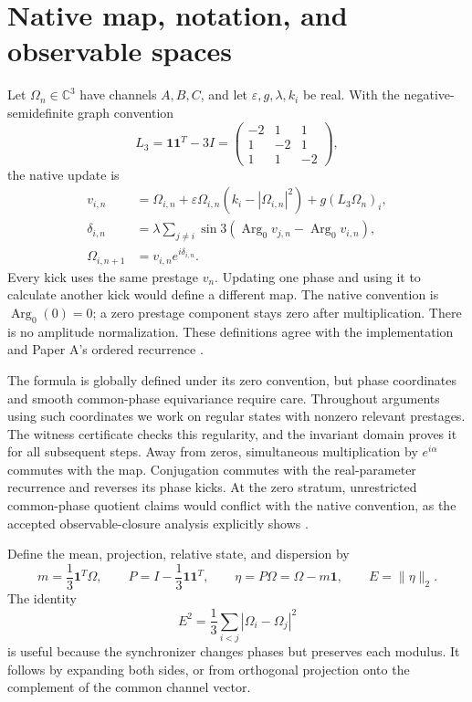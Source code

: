 \documentclass[11pt,a4paper]{article}
\numberwithin{equation}{section}
\theoremstyle{remark}\newtheorem{remark}[theorem]{Remark}
\newcommand{\C}{\mathbb C}\newcommand{\R}{\mathbb R}
\newcommand{\one}{\mathbf1}\newcommand{\eps}{\varepsilon}
\newcommand{\Argz}{\operatorname{Arg}_0}
\begin{document}
\section{Native map, notation, and observable spaces}\label{sec:map}

Let $\Omega_n\in\C^3$ have channels $A,B,C$, and let $\eps,g,\lambda,k_i$ be real. With the negative-semidefinite graph convention
\begin{equation}
L_3=\one\one^T-3I=
\begin{pmatrix}-2&1&1\\1&-2&1\\1&1&-2\end{pmatrix},
\end{equation}
the native update is
\begin{align}
v_{i,n}&=\Omega_{i,n}+\eps\Omega_{i,n}(k_i-|\Omega_{i,n}|^2)
                   +g(L_3\Omega_n)_i,\label{eq:pre}\\
\delta_{i,n}&=\lambda\sum_{j\ne i}\sin3(\Argz v_{j,n}-\Argz v_{i,n}),\label{eq:kicks}\\
\Omega_{i,n+1}&=v_{i,n}e^{i\delta_{i,n}}.\label{eq:post}
\end{align}
Every kick uses the same prestage $v_n$. Updating one phase and using it to calculate another kick would define a different map. The native convention is $\Argz(0)=0$; a zero prestage component stays zero after multiplication. There is no amplitude normalization. These definitions agree with the implementation and Paper A's ordered recurrence \cite{kernel,paperA}.

The formula is globally defined under its zero convention, but phase coordinates and smooth common-phase equivariance require care. Throughout arguments using such coordinates we work on regular states with nonzero relevant prestages. The witness certificate checks this regularity, and the invariant domain proves it for all subsequent steps. Away from zeros, simultaneous multiplication by $e^{i\alpha}$ commutes with the map. Conjugation commutes with the real-parameter recurrence and reverses its phase kicks. At the zero stratum, unrestricted common-phase quotient claims would conflict with the native convention, as the accepted observable-closure analysis explicitly shows \cite{closure}.

Define the mean, projection, relative state, and dispersion by
\begin{equation}
m=\frac13\one^T\Omega,\qquad P=I-\frac13\one\one^T,
\qquad\eta=P\Omega=\Omega-m\one,\qquad E=\|\eta\|_2.
\label{eq:mean}
\end{equation}
The identity
\begin{equation}
E^2=\frac13\sum_{i<j}|\Omega_i-\Omega_j|^2\label{eq:pairspread}
\end{equation}
is useful because the synchronizer changes phases but preserves each modulus. It follows by expanding both sides, or from orthogonal projection onto the complement of the common channel vector.
\end{document}
